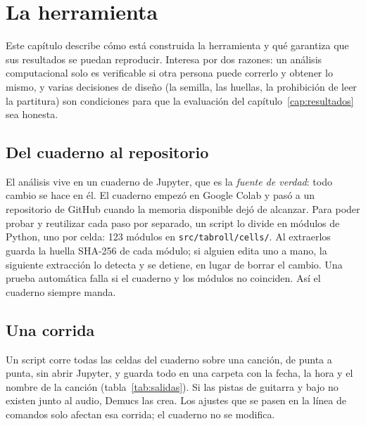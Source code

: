 \chapter{La herramienta}\label{cap:herramienta}

Este capítulo describe cómo está construida la herramienta y qué garantiza que sus resultados se puedan reproducir.
Interesa por dos razones: un análisis computacional solo es verificable si otra persona puede correrlo y obtener lo
mismo, y varias decisiones de diseño (la semilla, las huellas, la prohibición de leer la partitura) son condiciones para
que la evaluación del capítulo~\ref{cap:resultados} sea honesta.

\section{Del cuaderno al repositorio}

El análisis vive en un cuaderno de Jupyter, que es la \emph{fuente de verdad}: todo cambio se hace en él. El cuaderno
empezó en Google Colab y pasó a un repositorio de GitHub cuando la memoria disponible dejó de alcanzar. Para poder probar
y reutilizar cada paso por separado, un script lo divide en módulos de Python, uno por celda: 123 módulos en
\texttt{src/tabroll/cells/}. Al extraerlos guarda la huella SHA-256 de cada módulo; si alguien edita uno a mano, la
siguiente extracción lo detecta y se detiene, en lugar de borrar el cambio. Una prueba automática falla si el cuaderno y
los módulos no coinciden. Así el cuaderno siempre manda.

\section{Una corrida}

Un script corre todas las celdas del cuaderno sobre una canción, de punta a punta, sin abrir Jupyter, y guarda todo en una
carpeta con la fecha, la hora y el nombre de la canción (tabla~\ref{tab:salidas}). Si las pistas de guitarra y bajo no
existen junto al audio, Demucs las crea. Los ajustes que se pasen en la línea de comandos solo afectan esa corrida; el
cuaderno no se modifica.

